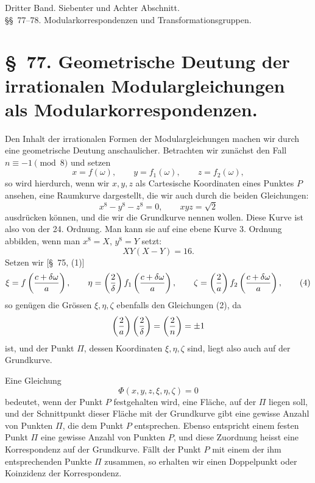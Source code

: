 \documentclass[11pt]{article}
\begin{document}
\begin{center}{\large Dritter Band. Siebenter und Achter Abschnitt.}\\[0.4em]{\Large \S\S~77--78. Modularkorrespondenzen und Transformationsgruppen.}\end{center}

\section*{\S~77. Geometrische Deutung der irrationalen Modulargleichungen als Modularkorrespondenzen.}

Den Inhalt der irrationalen Formen der Modulargleichungen machen wir durch eine geometrische Deutung anschaulicher. Betrachten wir zunächst den Fall $n\equiv -1\pmod 8$ und setzen
\begin{equation}
 x=f(\omega),\qquad y=f_1(\omega),\qquad z=f_2(\omega),
\tag{1}
\end{equation}
so wird hierdurch, wenn wir $x,y,z$ als Cartesische Koordinaten eines Punktes $P$ ansehen, eine Raumkurve dargestellt, die wir auch durch die beiden Gleichungen:
\begin{equation}
 x^8-y^8-z^8=0,
 \qquad
 xyz=\sqrt{2}
\tag{2}
\end{equation}
ausdrücken können, und die wir die Grundkurve nennen wollen. Diese Kurve ist also von der 24. Ordnung. Man kann sie auf eine ebene Kurve 3. Ordnung abbilden, wenn man $x^8=X$, $y^8=Y$ setzt:
\begin{equation}
 XY(X-Y)=16.
\tag{3}
\end{equation}
Setzen wir [\S~75, (1)]
\begin{equation}
 \xi=f\left({c+\delta\omega\over a}\right),\qquad
 \eta=\left({2\over\delta}\right)f_1\left({c+\delta\omega\over a}\right),\qquad
 \zeta=\left({2\over a}\right)f_2\left({c+\delta\omega\over a}\right),
\tag{4}
\end{equation}
so genügen die Grössen $\xi,\eta,\zeta$ ebenfalls den Gleichungen (2), da
\[
 \left({2\over a}\right)\left({2\over\delta}\right)=\left({2\over n}\right)=\pm1
\]
ist, und der Punkt $\Pi$, dessen Koordinaten $\xi,\eta,\zeta$ sind, liegt also auch auf der Grundkurve.

Eine Gleichung
\[
 \Phi(x,y,z,\xi,\eta,\zeta)=0
\]
bedeutet, wenn der Punkt $P$ festgehalten wird, eine Fläche, auf der $\Pi$ liegen soll, und der Schnittpunkt dieser Fläche mit der Grundkurve gibt eine gewisse Anzahl von Punkten $\Pi$, die dem Punkt $P$ entsprechen. Ebenso entspricht einem festen Punkt $\Pi$ eine gewisse Anzahl von Punkten $P$, und diese Zuordnung heisst eine Korrespondenz auf der Grundkurve. Fällt der Punkt $P$ mit einem der ihm entsprechenden Punkte $\Pi$ zusammen, so erhalten wir einen Doppelpunkt oder Koinzidenz der Korrespondenz.
\end{document}
